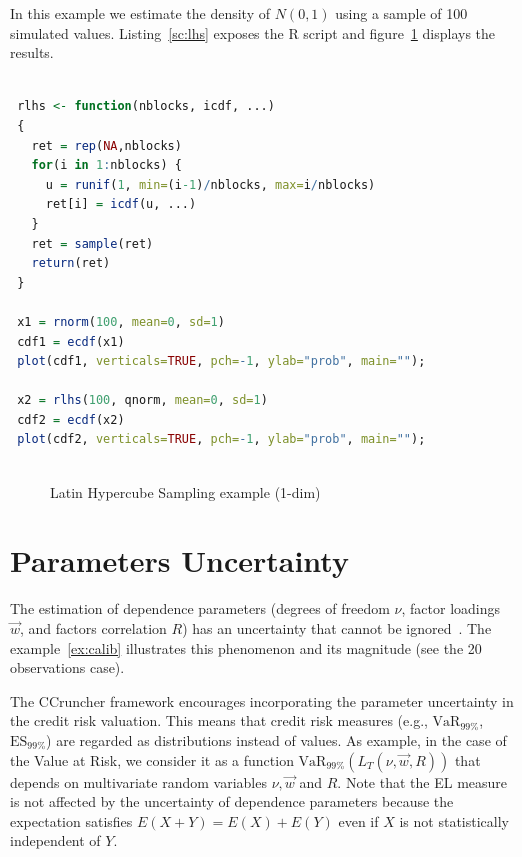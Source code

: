 \documentclass[11pt,fleqn]{book} %
\begin{document}
\begin{example}
	In this example we estimate the density of $N(0,1)$ using a sample of 
	100 simulated values. Listing~\ref{sc:lhs} exposes the R script and 
	figure~\ref{fig:lhs} displays the results.

	\begin{lstlisting}[language=R, label=sc:lhs, caption=Latin Hypercube Sampling example (R script)]

 rlhs <- function(nblocks, icdf, ...) 
 {
   ret = rep(NA,nblocks)
   for(i in 1:nblocks) {
     u = runif(1, min=(i-1)/nblocks, max=i/nblocks)
     ret[i] = icdf(u, ...)
   }
   ret = sample(ret)
   return(ret)
 }

 x1 = rnorm(100, mean=0, sd=1)
 cdf1 = ecdf(x1)
 plot(cdf1, verticals=TRUE, pch=-1, ylab="prob", main="");
 
 x2 = rlhs(100, qnorm, mean=0, sd=1)
 cdf2 = ecdf(x2)
 plot(cdf2, verticals=TRUE, pch=-1, ylab="prob", main="");
 
	\end{lstlisting}
	\begin{figure}[!ht]
		\centering
		\caption{Latin Hypercube Sampling example (1-dim)}
		\label{fig:lhs} 
	\end{figure}
\end{example}

\section{Parameters Uncertainty}

The estimation of dependence parameters (degrees of freedom $\nu$, factor
loadings $\vec{w}$, and factors correlation $R$) has an uncertainty that 
cannot be ignored~\cite{tarashev:2010,gossl:2005}. The example~\ref{ex:calib} 
illustrates this phenomenon and its magnitude (see the 20 observations case).

The CCruncher framework encourages incorporating the parameter uncertainty 
in the credit risk valuation. This means that credit risk measures
(e.g., $\text{VaR}_{99\%}$, $\text{ES}_{99\%}$) are regarded as distributions 
instead of values. As example, in the case of the Value at Risk, we 
consider it as a function $\text{VaR}_{99\%}(L_T(\nu,\vec{w},R))$ that 
depends on multivariate random variables $\nu, \vec{w}$ and $R$.
Note that the EL measure is not affected by the uncertainty of dependence 
parameters because the expectation satisfies $E(X+Y)=E(X)+E(Y)$ even if $X$ 
is not statistically independent of $Y$.
\end{document}
